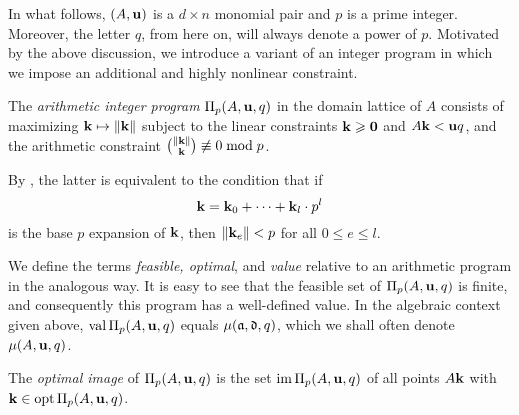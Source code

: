 \documentclass[11pt]{amsart}
\begin{document}
In what follows, $(A, \mathbf{u})$ is a $d \times n$ monomial pair and $p$ is a prime integer.
Moreover, the letter $q$, from here on, will always denote a power of $p$.
Motivated by the above discussion, we introduce a variant of an integer program in which we impose an additional and highly nonlinear constraint.

\begin{definition} 
\label{aip: D}
The \emph{arithmetic integer program} $\Pi_p(A, \mathbf{u}, q)$ in the domain lattice of $A$ consists of maximizing $\mathbf{k} \mapsto \| \mathbf{k} \|$ subject to the linear constraints $\mathbf{k} \geqslant \mathbf{0}$ and $A \mathbf{k} < \mathbf{u}q$, and the arithmetic constraint $\binom{\| \mathbf{k} \|}{\mathbf{k}} \not \equiv 0 \bmod p$.
\end{definition}

By , the latter  is equivalent to the condition that  if \[ \mathbf{k} = \mathbf{k}_0 + \cdots + \mathbf{k}_l \cdot  p^l\] is the   base $p$ expansion of $\mathbf{k}$, then $\| \mathbf{k}_e \| < p$ for all $0 \leq e \leq l$.

We define the terms \emph{feasible, optimal}, and \emph{value} relative to an arithmetic program in the analogous way.
It is easy to see that the feasible set of $\Pi_p(A,\mathbf{u},q)$ is finite, and consequently this program has a well-defined value.
In the algebraic context given above, $\operatorname{val} \Pi_p(A,\mathbf{u},q)$ equals $\mu(\mathfrak{a},\mathfrak{d},q)$, which we shall often denote $\mu(A,\mathbf{u},q)$.

\begin{definition}
The \emph{optimal image} of $\Pi_p(A, \mathbf{u}, q)$ is the set $\operatorname{im} \Pi_p(A, \mathbf{u}, q)$ of all points  $A \mathbf{k}$ with $\mathbf{k} \in \operatorname{opt} \Pi_p(A, \mathbf{u}, q)$. 
\end{definition}
\end{document}
